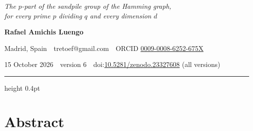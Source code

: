 \documentclass[10pt]{article}
\theoremstyle{ds}
\theoremstyle{dsrem}
\begin{document}
\thispagestyle{empty}
\begin{center}
\vspace*{2mm}
{\fontsize{25}{30}\selectfont\bfseries{}\par}
\vspace{4.5mm}
{\fontsize{13.5}{17.5}\selectfont\itshape The $p$-part of the sandpile group of the Hamming graph,\\ for every prime $p$ dividing $q$ and every dimension $d$\par}
\vspace{7mm}
{\bfseries Rafael Amichis Luengo\par}
\vspace{1.4mm}
Madrid, Spain \,\textperiodcentered\, tretoef@gmail.com \,\textperiodcentered\, ORCID \href{https://orcid.org/0009-0008-6252-675X}{0009-0008-6252-675X}\par
\vspace{0.6mm}
15 October 2026 \,\textperiodcentered\, version 6 \,\textperiodcentered\, doi:\href{https://doi.org/10.5281/zenodo.23327608}{10.5281/zenodo.23327608} (all versions)\par
\end{center}
\vspace{2mm}
{\color{rulegrey}\hrule height 0.4pt}
\section*{Abstract}
\end{document}
